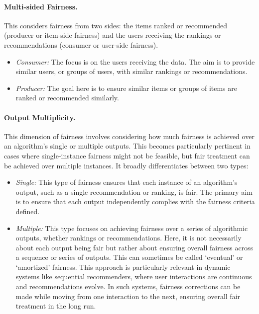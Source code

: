 \paragraph{Multi-sided Fairness.}
\label{subsubsec:fairness_tax_side}

This considers fairness from two sides: the items ranked or recommended (producer or item-side fairness) and the users receiving the rankings or recommendations (consumer or user-side fairness).

\begin{itemize}
  \item \emph{Consumer:} The focus is on the users receiving the data. The aim is to provide similar users, or groups of users, with similar rankings or recommendations.
  \item \emph{Producer:} The goal here is to ensure similar items or groups of items are ranked or recommended similarly.
\end{itemize}


\paragraph{Output Multiplicity.}
\label{subsubsec:fairness_tax_output}

 This dimension of fairness involves considering how much fairness is achieved over an algorithm's single or multiple outputs. This becomes particularly pertinent in cases where single-instance fairness might not be feasible, but fair treatment can be achieved over multiple instances. It broadly differentiates between two types:

\begin{itemize}
  \item \emph{Single:} This type of fairness ensures that each instance of an algorithm's output, such as a single recommendation or ranking, is fair. The primary aim is to ensure that each output independently complies with the fairness criteria defined.
  \item \emph{Multiple:} This type focuses on achieving fairness over a series of algorithmic outputs, whether rankings or recommendations. Here, it is not necessarily about each output being fair but rather about ensuring overall fairness across a sequence or series of outputs. This can sometimes be called `eventual' or `amortized' fairness. This approach is particularly relevant in dynamic systems like sequential recommenders, where user interactions are continuous and recommendations evolve. In such systems, fairness corrections can be made while moving from one interaction to the next, ensuring overall fair treatment in the long run.
\end{itemize}





